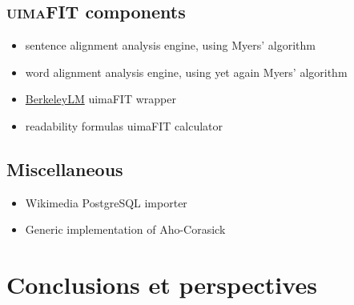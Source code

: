 \documentclass[a4paper, 11pt, onepage]{scrreprt}
\begin{document}
\section{\textsc{uimaFIT} components}
\label{sec:uimafit-components}

\begin{itemize}
\item sentence alignment analysis engine, using Myers' algorithm
\item word alignment analysis engine, using yet again Myers' algorithm
\item \href{https://berkeleylm.googlecode.com/}{BerkeleyLM} uimaFIT
  wrapper
\item readability formulas uimaFIT calculator
\end{itemize}

\section{Miscellaneous}
\label{sec:misc-software}
\begin{itemize}
\item Wikimedia PostgreSQL importer
\item Generic implementation of Aho-Corasick
\end{itemize}

\chapter{Conclusions  et perspectives}



\end{document}
